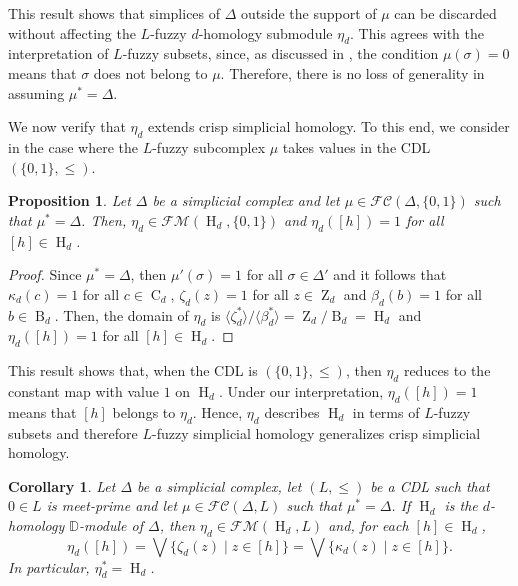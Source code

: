 \documentclass[a4paper,10pt]{article}
\newtheorem{proposition}[theorem]{Proposition}
\newtheorem{corollary}[theorem]{Corollary}
\newcommand{\bbd}{\mathbb{D}}
\newcommand{\calfm}{\mathcal{F\!M}}
\newcommand{\calfc}{\mathcal{FC}}
\DeclareMathOperator{\Co}{C}
\DeclareMathOperator{\Zo}{Z}
\DeclareMathOperator{\Bo}{B}
\DeclareMathOperator{\Ho}{H}
\begin{document}
This result shows that simplices of \(\Delta\) outside the support of \(\mu\) can be discarded without affecting the \(L\)-fuzzy \(d\)-homology submodule \(\eta_d\). This agrees with the interpretation of \(L\)-fuzzy subsets, since, as discussed in , the condition \(\mu(\sigma)=0\) means that \(\sigma\) does not belong to \(\mu\). Therefore, there is no loss of generality in assuming \(\mu^*=\Delta\).

We now verify that \(\eta_d\) extends crisp simplicial homology. To this end, we consider  in the case where the \(L\)-fuzzy subcomplex \(\mu\) takes values in the CDL \((\{0,1\}, \leq)\).

\begin{proposition}
\label{prop:generalize}
Let \(\Delta\) be a simplicial complex and let \(\mu \in \calfc(\Delta,\{0,1\})\) such that \(\mu^*=\Delta\). Then, \(\eta_d \in \calfm(\Ho_d,\{0,1\})\) and \(\eta_d([h])=1\) for all \([h] \in \Ho_d\). 
\end{proposition}

\begin{proof}
Since \(\mu^*=\Delta\), then \(\mu'(\sigma)=1\) for all \(\sigma \in \Delta'\) and it follows that \(\kappa_d(c)=1\) for all \(c \in \Co_d\), \(\zeta_d(z)=1\) for all \(z \in \Zo_d\) and \(\beta_d(b)=1\) for all \(b \in \Bo_d\). Then, the domain of \(\eta_d\) is \(\langle\zeta_d^*\rangle/\langle\beta_d^*\rangle= \Zo_d/\Bo_d=\Ho_d\) and \(\eta_d([h])=1\) for all \([h] \in \Ho_d\). 
\end{proof}

This result shows that, when the CDL is \((\{0,1\},\leq)\), then \(\eta_d\) reduces to the constant map with value \(1\) on \(\Ho_d\). Under our interpretation, \(\eta_d([h])=1\) means that \([h]\) belongs to \(\eta_d\). Hence, \(\eta_d\) describes \(\Ho_d\) in terms of \(L\)-fuzzy subsets and therefore \(L\)-fuzzy simplicial homology generalizes crisp simplicial homology. 

\begin{corollary}
\label{cor:eta_value}
Let \(\Delta\) be a simplicial complex, let \((L,\leq)\) be a CDL such that \(0 \in L\) is meet-prime and let \(\mu \in \calfc(\Delta,L)\) such that  \(\mu^* = \Delta\). If \(\Ho_d\) is the \(d\)-homology \(\bbd\)-module of \(\Delta\), then \(\eta_d \in \calfm(\Ho_d,L)\) and, for each \([h] \in \Ho_d\),
\[
\eta_d([h]) =
\bigvee \{ \zeta_d(z) \mid z \in [h] \}
=\bigvee \{ \kappa_d(z) \mid z \in [h]\}.
\]
In particular, $\eta_d^*=\Ho_d$.
\end{corollary}
\end{document}
